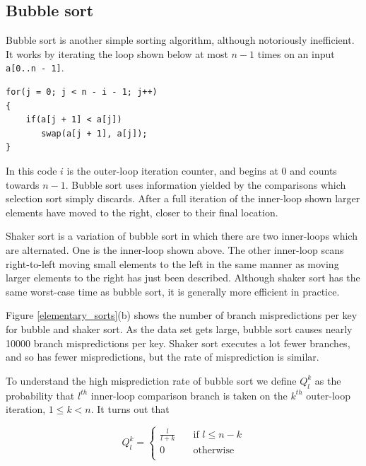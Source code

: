 \documentclass[acmtocl]{acmtrans2m}
\begin{document}
\subsection{Bubble sort}
\label{bubble_sort}

Bubble sort is another simple sorting algorithm, although notoriously
inefficient. It works by iterating the loop shown below at most $n - 1$ times on
an input \texttt{a[0..n - 1]}.

\begin{verbatim}
for(j = 0; j < n - i - 1; j++)
{
    if(a[j + 1] < a[j])
       swap(a[j + 1], a[j]);
}

\end{verbatim} 

In this code $i$ is the outer-loop iteration counter, and begins at 0 and counts
towards $n - 1$. Bubble sort uses information yielded by the comparisons which
selection sort simply discards. After a full iteration of the inner-loop shown
larger elements have moved to the right, closer to their final location.

Shaker sort is a variation of bubble sort in which there are two inner-loops
which are alternated. One is the inner-loop shown above. The other inner-loop
scans right-to-left moving small elements to the left in the same manner as
moving larger elements to the right has just been described.  Although shaker
sort has the same worst-case time as bubble sort, it is generally more efficient
in practice.

Figure \ref{elementary_sorts}(b) shows the number of branch mispredictions per
key for bubble and shaker sort. As the data set gets large, bubble sort causes
nearly 10000 branch mispredictions per key. Shaker sort executes a lot fewer
branches, and so has fewer mispredictions, but the rate of misprediction is
similar.

To understand the high misprediction rate of bubble sort we define $Q^k_l$ as
the probability that $l^{th}$ inner-loop comparison branch is taken on the
$k^{th}$ outer-loop iteration, $1 \leq k < n$. It turns out that

\begin{equation}
\label{bubble_equation}
Q^k_l = 
\left\{ 
\begin{array}{ll}
  \frac{l}{l + k} & \quad \mbox{if $l \leq n - k$}\\
  0 & \quad \mbox{otherwise}\\ 
\end{array} 
\right. 
\end{equation}
\end{document}

